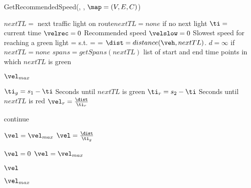 \begin{algorithm}
\caption{GetRecommendedSpeed(\veh, \route, $\map = (V, E, C)$)}\label{alg.recommendedSpeed}
\begin{algorithmic}[1]
\State $nextTL= $ next traffic light on route\Comment $nextTL=none$ if no next light \label{alg:recSpeed:initStart}
\State $\ti=$ current time
\State $\velrec = 0$ \Comment Recommended speed
\State $\velslow = 0$ \Comment Slowest speed for reaching a green light
\State \velmax = \espeed s.t. \eend=\vehposstart
\Else
\State \velmax = \vehposspeed
\EndIf
\State $\dist=distance(\veh,nextTL)$. \Comment $d=\infty$ if $nextTL=none$\label{alg:recSpeed:initEnd}
\State $spans = getSpans(nextTL)$ \Comment list of start and end time points in which $nextTL$ is green

\Return $\vel_{max}$ \label{alg:recSpeed:maxSpeed}
\EndIf

\label{alg:recSpeed:loopSpans}
\State $\ti_g = s_1 - \ti$ \Comment Seconds until $nextTL$ is green \label{alg:recSpeed:tg}
\State $\ti_r = s_2 - \ti$ \Comment Seconds until $nextTL$ is red\label{alg:recSpeed:tr}
\State $\vel_r = \frac{\dist}{\ti_r}$\label{alg:recSpeed:hr}

\label{alg:recSpeed:continue}
\State continue
\EndIf

\label{alg:recSpeed:green}
\State $\vel=\vel_{max}$
\Else
\State $\vel = \frac{\dist}{\ti_g}$\label{alg:recSpeed:h}
\EndIf

\label{alg:recSpeed:h0} %
\State $\vel = 0$
\State $\vel=\vel_{max}$
\EndIf\label{alg:recSpeed:hmax}

\State\Return $\vel$\label{alg:recSpeed:returnh}
\EndFor

\State\Return $\vel_{max}$\label{alg:recSpeed:returnmax}

\end{algorithmic}
\end{algorithm}
